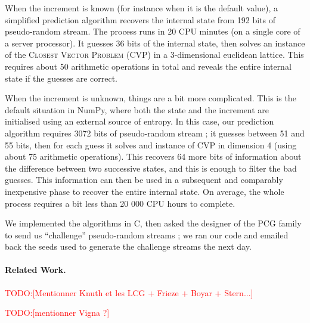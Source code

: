 \documentclass[submission,svgnames,journal=tosc]{iacrtrans}
\newcommand{\todo}[1]{\textcolor{red}{TODO:[#1]}}
\begin{document}
When the increment is known (for instance when it is the default value), a
simplified prediction algorithm recovers the internal state from 192 bits of
pseudo-random stream. The process runs in 20 CPU minutes (on a single core of a
server processor). It guesses 36 bits of the internal state, then solves an
instance of the \textsc{Closest Vector Problem} (CVP) in a 3-dimensional
euclidean lattice. This requires about 50 arithmetic operations in total and
reveals the entire internal state if the guesses are correct.

When the increment is unknown, things are a bit more complicated. This is the
default situation in \textsf{NumPy}, where both the state and the increment are
initialised using an external source of entropy. In this case, our prediction
algorithm requires 3072 bits of pseudo-random stream ; it guesses between 51 and
55 bits, then for each guess it solves and instance of CVP in dimension 4 (using
about 75 arithmetic operations). This recovers 64 more bits of information about
the difference between two successive states, and this is enough to filter the
bad guesses. This information can then be used in a subsequent and comparably
inexpensive phase to recover the entire internal state. On average, the whole
process requires a bit less than 20 000 CPU hours to complete.

We implemented the algorithms in \textsf{C}, then asked the designer of the PCG
family to send us ``challenge'' pseudo-random streams ; we ran our code and
emailed back the seeds used to generate the challenge streams the next day.

\paragraph{Related Work.} \todo{Mentionner Knuth et les LCG + Frieze + Boyar + Stern...}

\todo{mentionner Vigna ?}


\end{document}

